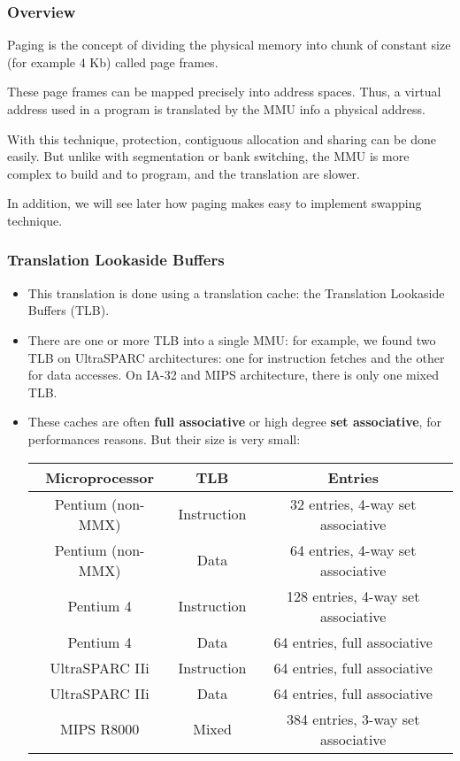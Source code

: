 
\begin{frame}
  \frametitle{Overview}

  Paging is the concept of dividing the physical memory into chunk of
  constant size (for example 4 Kb) called page frames.

  \-

  These page frames can be mapped precisely into address spaces. Thus,
  a virtual address used in a program is translated by the MMU info a
  physical address.

  \-

  With this technique, protection, contiguous allocation and sharing
  can be done easily. But unlike with segmentation or bank switching,
  the MMU is more complex to build and to program, and the translation
  are slower.

  \-

  In addition, we will see later how paging makes easy to implement
  swapping technique.

\end{frame}


\begin{frame}
  \frametitle{Translation Lookaside Buffers}

  \begin{itemize}
    \item
    This translation is done using a translation cache: the
    Translation Lookaside Buffers (TLB).
    \item
    There are one or more TLB into a single MMU: for example, we
    found two TLB on UltraSPARC architectures: one for instruction
    fetches and the other for data accesses. On IA-32 and MIPS
    architecture, there is only one mixed TLB.
    \item
    These caches are often \textbf{full associative} or high degree
    \textbf{set associative}, for performances reasons. But their size
    is very small:
    \begin{tabular}{|c|c|c|}
    \hline
    Microprocessor & TLB & Entries \\
    \hline
    Pentium (non-MMX) & Instruction & 32 entries, 4-way set associative \\
    \hline
    Pentium (non-MMX) & Data & 64 entries, 4-way set associative \\
    \hline
    Pentium 4 & Instruction & 128 entries, 4-way set associative \\
    \hline
    Pentium 4 & Data & 64 entries, full associative \\
    \hline
    UltraSPARC IIi & Instruction & 64 entries, full associative \\
    \hline
    UltraSPARC IIi & Data & 64 entries, full associative \\
    \hline
    MIPS R8000 & Mixed & 384 entries, 3-way set associative \\
    \hline
    \end{tabular}
  \end{itemize}
\end{frame}

